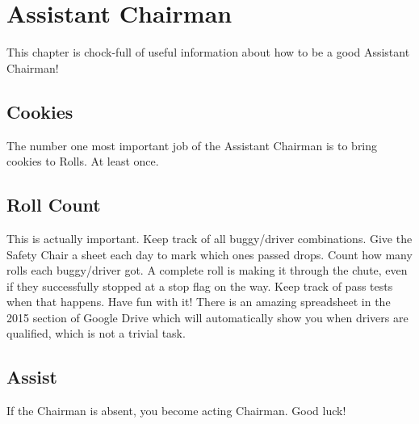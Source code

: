 \chapter{Assistant Chairman}
\label{ch:Ass Chair}
This chapter is chock-full of useful information about how to be a good
Assistant Chairman!

\section{Cookies}
\label{sec:Cookies}
The number one most important job of the Assistant Chairman is to bring cookies
to Rolls. At least once.

\section{Roll Count}
\label{sec:Roll Count}
This is actually important. Keep track of all buggy/driver combinations.
Give the Safety Chair a sheet each day to mark which ones passed drops.
Count how many rolls each buggy/driver got. A complete roll is making
it through the chute, even if they successfully stopped at a stop flag on the
way. Keep track of pass tests when that happens. Have fun with it! There is an
amazing spreadsheet in the 2015 section of Google Drive which will
automatically show you when drivers are qualified, which is not a trivial task.

\section{Assist}
\label{sec: Assist}
If the Chairman is absent, you become acting Chairman. Good luck!
